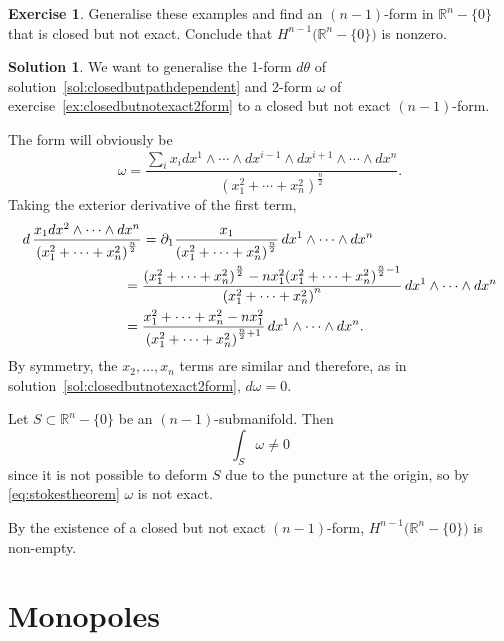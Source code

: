 \documentclass[11pt, a4paper]{report}
\theoremstyle{definition}
\newtheorem{exercise}{Exercise}[part]
\newtheorem{solution}{Solution}[part]
\newenvironment{ex}{\begin{exercise}}{\end{exercise}\pagebreak[1]}
\newenvironment{sol}{\begin{solution}}{\end{solution}\pagebreak[3]}
\renewcommand*{\d}{\ensuremath\mathop{}\mathopen{}d}
\begin{document}
\begin{ex}

Generalise these examples and find an $(n-1)$-form in $\mathbb{R}^n - \{0\}$ that is closed but not exact.
Conclude that $H^{n - 1} \bigl( \mathbb{R}^{n} - \{0\} \bigr)$ is nonzero.

\end{ex}

\begin{sol}

We want to generalise the 1-form $d\theta$ of solution~\ref{sol:closedbutpathdependent} and 2-form $\omega$ of exercise~\ref{ex:closedbutnotexact2form} to a closed but not exact $(n-1)$-form.

The form will obviously be
\[
    \omega = \frac{\sum_i x_i dx^1 \wedge \cdots \wedge dx^{i - 1} \wedge dx^{i + 1} \wedge \cdots \wedge dx^n}
                  {{(x_1^2 + \cdots + x_n^2)}^\frac{n}{2}}.
\]
Taking the exterior derivative of the first term,
\begin{align*}
    d \, \frac{x_1 dx^2 \wedge \cdots \wedge dx^n}{{(x_1^2 + \cdots + x_n^2)}^\frac{n}{2}}
        &= \partial_1 \frac{x_1}{{(x_1^2 + \cdots + x_n^2)}^\frac{n}{2}} \d x^1 \wedge \cdots \wedge dx^n \\
        ={}& \frac{{(x_1^2 + \cdots + x_n^2)}^\frac{n}{2} - n x_1^2 {(x_1^2 + \cdots + x_n^2)}^{\frac{n}{2} - 1}}
                  {{(x_1^2 + \cdots + x_n^2)}^n} \d x^1 \wedge \cdots \wedge dx^n \\
        ={}& \frac{x_1^2 + \cdots + x_n^2 - n x_1^2}
                  {{(x_1^2 + \cdots + x_n^2)}^{\frac{n}{2} + 1}} \d x^1 \wedge \cdots \wedge dx^n.
\end{align*}
By symmetry, the $x_2, \ldots, x_n$ terms are similar and therefore, as in solution~\ref{sol:closedbutnotexact2form}, $d\omega = 0$.

Let $S \subset \mathbb{R}^n - \{0\}$ be an $(n - 1)$-submanifold. Then
\[
    \int_S \omega \neq 0
\]
since it is not possible to deform $S$ due to the puncture at the origin, so by \ref{eq:stokestheorem} $\omega$ is not exact. %

By the existence of a closed but not exact $(n - 1)$-form, $H^{n - 1} \bigl( \mathbb{R}^n - \{0\} \bigr)$ is non-empty.

\end{sol}

\section{Monopoles}
\end{document}
